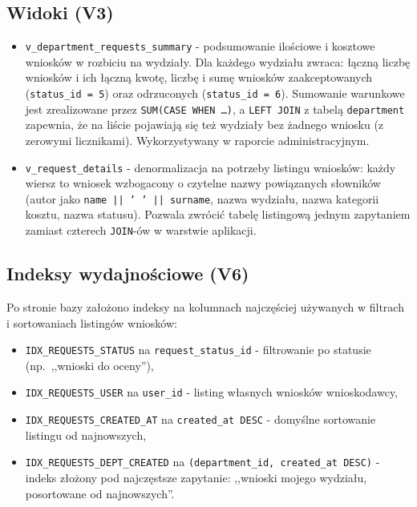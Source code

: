 \documentclass[12pt,a4paper]{article}
\begin{document}
\subsection{Widoki (V3)}
\begin{itemize}[leftmargin=*]
  \item \texttt{v\_department\_requests\_summary} - podsumowanie ilościowe
        i kosztowe wniosków w rozbiciu na wydziały. Dla każdego wydziału zwraca:
        łączną liczbę wniosków i ich łączną kwotę, liczbę i sumę wniosków
        zaakceptowanych (\texttt{status\_id = 5}) oraz odrzuconych
        (\texttt{status\_id = 6}). Sumowanie warunkowe jest zrealizowane
        przez \texttt{SUM(CASE WHEN \ldots)}, a \texttt{LEFT JOIN} z tabelą
        \texttt{department} zapewnia, że na liście pojawiają się też
        wydziały bez żadnego wniosku (z zerowymi licznikami).
        Wykorzystywany w raporcie administracyjnym.
  \item \texttt{v\_request\_details} - denormalizacja na potrzeby listingu
        wniosków: każdy wiersz to wniosek wzbogacony o czytelne nazwy
        powiązanych słowników (autor jako \texttt{name || ' ' || surname},
        nazwa wydziału, nazwa kategorii kosztu, nazwa statusu). Pozwala
        zwrócić tabelę listingową jednym zapytaniem zamiast czterech
        \texttt{JOIN}-ów w warstwie aplikacji.
\end{itemize}

\subsection{Indeksy wydajnościowe (V6)}
Po stronie bazy założono indeksy na kolumnach najczęściej używanych
w filtrach i sortowaniach listingów wniosków:

\begin{itemize}[leftmargin=*]
  \item \texttt{IDX\_REQUESTS\_STATUS} na \texttt{request\_status\_id}
        - filtrowanie po statusie (np.\ ,,wnioski do oceny''),
  \item \texttt{IDX\_REQUESTS\_USER} na \texttt{user\_id}
        - listing własnych wniosków wnioskodawcy,
  \item \texttt{IDX\_REQUESTS\_CREATED\_AT} na \texttt{created\_at DESC}
        - domyślne sortowanie listingu od najnowszych,
  \item \texttt{IDX\_REQUESTS\_DEPT\_CREATED} na \texttt{(department\_id,
        created\_at DESC)} - indeks złożony pod najczęstsze zapytanie:
        ,,wnioski mojego wydziału, posortowane od najnowszych''.
\end{itemize}
\end{document}

